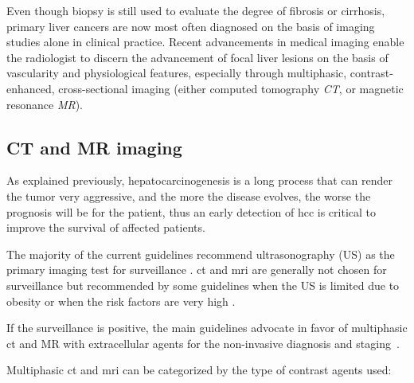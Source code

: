 Even though biopsy is still used to evaluate the degree of fibrosis or
cirrhosis, primary liver cancers are now most often diagnosed on the
basis of imaging studies alone in clinical practice. Recent advancements
in medical imaging enable the radiologist to discern the advancement of focal
liver lesions on the basis of vascularity and physiological features,
especially through multiphasic, contrast-enhanced, cross-sectional
imaging (either computed tomography \emph{CT}, or magnetic resonance
\emph{MR}).

\subsection{CT and MR imaging}\label{ct-and-mr-imaging}

As explained previously, hepatocarcinogenesis is a long process that can
render the tumor very aggressive, and the more the disease evolves, the
worse the prognosis will be for the patient, thus an early detection of
\ac{hcc} is critical to improve the survival of affected patients.

The majority of the current guidelines recommend ultrasonography (US) as
the primary imaging test for surveillance \cite{Choi2014}. \ac{ct} and \ac{mri} are generally not chosen for surveillance but
recommended by some guidelines when the US is limited due to obesity or
when the risk factors are very high \cite{Omata2010, Llovet2012}.

If the surveillance is positive, the main guidelines advocate in favor
of multiphasic \ac{ct} and MR with extracellular agents for the non-invasive
diagnosis and staging \cite{Kudo2010, Llovet2012, Omata2010, Bruix2011}.

Multiphasic \ac{ct} and \ac{mri} can be categorized by the type of contrast agents
used:

